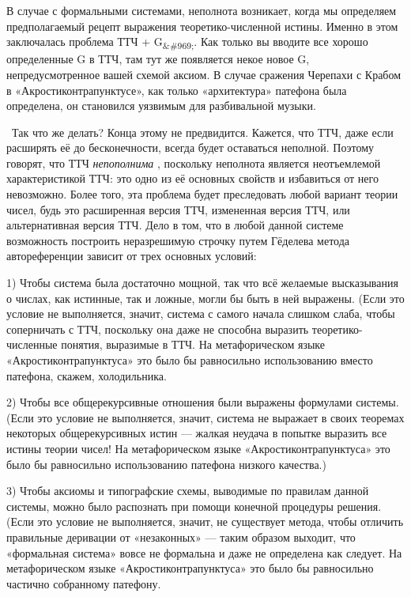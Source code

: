 \documentclass[../main.tex]{subfiles}
\begin{document}
В случае с формальными системами, неполнота возникает, когда мы определяем предполагаемый рецепт выражения теоретико-численной истины. Именно в этом заключалась проблема ТТЧ + G\textsubscript{\&\#969;}. Как только вы вводите все хорошо определенные G в ТТЧ, там тут же появляется некое новое G, непредусмотренное вашей схемой аксиом. В случае сражения Черепахи с Крабом в «Акростиконтрапунктусе», как только «архитектура» патефона была определена, он становился уязвимым для разбивальной музыки.

~Так что же делать? Конца этому не предвидится. Кажется, что ТТЧ, даже если расширять её до бесконечности, всегда будет оставаться неполной. Поэтому говорят, что ТТЧ \emph{непополнима} , поскольку неполнота является неотъемлемой характеристикой ТТЧ: это одно из её основных свойств и избавиться от него невозможно. Более того, эта проблема будет преследовать любой вариант теории чисел, будь это расширенная версия ТТЧ, измененная версия ТТЧ, или альтернативная версия ТТЧ. Дело в том, что в любой данной системе возможность построить неразрешимую строчку путем Гёделева метода автореференции зависит от трех основных условий:

1) Чтобы система была достаточно мощной, так что всё желаемые высказывания о числах, как истинные, так и ложные, могли бы быть в ней выражены. (Если это условие не выполняется, значит, система с самого начала слишком слаба, чтобы соперничать с ТТЧ, поскольку она даже не способна выразить теоретико-численные понятия, выразимые в ТТЧ. На метафорическом языке «Акростиконтрапунктуса» это было бы равносильно использованию вместо патефона, скажем, холодильника.

2) Чтобы все общерекурсивные отношения были выражены формулами системы. (Если это условие не выполняется, значит, система не выражает в своих теоремах некоторых общерекурсивных истин --- жалкая неудача в попытке выразить все истины теории чисел! На метафорическом языке «Акростиконтрапунктуса» это было бы равносильно использованию патефона низкого качества.)

3) Чтобы аксиомы и типографские схемы, выводимые по правилам данной системы, можно было распознать при помощи конечной процедуры решения. (Если это условие не выполняется, значит, не существует метода, чтобы отличить правильные деривации от «незаконных» --- таким образом выходит, что «формальная система» вовсе не формальна и даже не определена как следует. На метафорическом языке «Акростиконтрапунктуса» это было бы равносильно частично собранному патефону.
\end{document}
